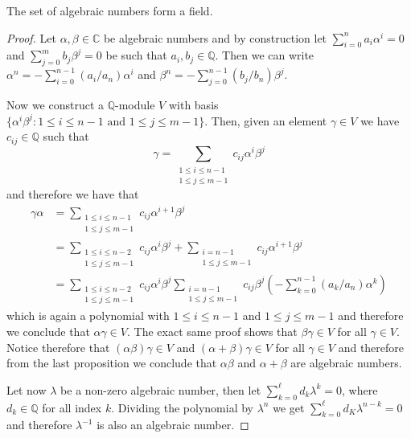 \begin{proposition}
    The set of algebraic numbers form a field.
\end{proposition}

\begin{proof}
    Let \(\alpha, \beta \in \mathbb{C}\) be algebraic numbers and by construction
    let \(\sum_{i=0}^n a_i \alpha^i = 0\) and \(\sum_{j=0}^m b_j \beta^j = 0\) be
    such that \(a_i, b_j \in \mathbb{Q}\). Then we can write \(\alpha^n =
    -\sum_{i=0}^{n-1} (a_i/a_n)\alpha^i\) and \(\beta^n = - \sum_{j=0}^{n-1}
    (b_j/b_n) \beta^j\).

    Now we construct a \(\mathbb{Q}\)-module \(V\) with basis  \(\{\alpha^i
    \beta^j : 1 \leqslant i \leqslant n-1 \text{ and } 1 \leqslant j \leqslant
    m-1\}\). Then, given an element \(\gamma \in V\) we have \(c_{ij} \in
    \mathbb{Q}\) such that
    \[
        \gamma = \sum_{\substack{1 \leqslant i \leqslant n-1 \\ 1 \leqslant j
                \leqslant m-1}} c_{ij} \alpha^i \beta^j
    \]
    and therefore we have that
    \begin{align*}
        \gamma \alpha
         & = \sum_{\substack{1 \leqslant i \leqslant n-1                \\ 1 \leqslant
                j \leqslant m-1}} c_{ij} \alpha^{i+1} \beta^j
        \\
         & = \sum_{\substack{1 \leqslant i \leqslant n - 2              \\ 1 \leqslant j \leqslant
                m-1}} c_{ij}\alpha^i \beta^j
        + \sum_{\substack{i=n-1                                         \\ 1 \leqslant j \leqslant m-1}} c_{ij}
        \alpha^{i+1} \beta^j
        \\
         & = \sum_{\substack{1 \leqslant i \leqslant n - 2              \\ 1 \leqslant j
        \leqslant m-1}} c_{ij} \alpha^i \beta^j \sum_{\substack{i = n-1 \\ 1
                \leqslant j \leqslant m-1}} c_{ij} \beta^j \left( - \sum_{k=0}^{n-1} (a_k/a_n)
        \alpha^k \right)
    \end{align*}
    which is again a polynomial with \(1 \leqslant i \leqslant n-1\) and \(1
    \leqslant j \leqslant m-1\) and therefore we conclude that \(\alpha \gamma
    \in V\). The exact same proof shows that \(\beta \gamma \in V\) for all
    \(\gamma \in V\). Notice therefore that \((\alpha\beta)\gamma \in V\) and
    \((\alpha + \beta) \gamma \in V\) for all \(\gamma \in V\) and therefore from
    the last proposition we conclude that \(\alpha\beta\) and  \(\alpha + \beta\)
    are algebraic numbers.

    Let now \(\lambda\) be a non-zero algebraic number, then let
    \(\sum_{k=0}^\ell d_k \lambda^k = 0\), where \(d_k \in \mathbb{Q}\) for all
    index \(k\). Dividing the polynomial by \(\lambda^n\) we get \(\sum_{k =
        0}^\ell d_K \lambda^{n-k} = 0\) and therefore \(\lambda^{-1}\) is also an
    algebraic number.
\end{proof}

